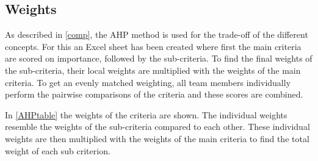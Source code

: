     

    

    
    


\subsection{Weights}
\label{subsec:weights}

As described in \autoref{comp}, the AHP method is used for the trade-off of the different concepts. For this an Excel sheet has been created where first the main criteria are scored on importance, followed by the sub-criteria. To find the final weights of the sub-criteria, their local weights are multiplied with the weights of the main criteria. To get an evenly matched weighting, all team members individually perform the pairwise comparisons of the criteria and these scores are combined. 



In \autoref{AHPtable} the weights of the criteria are shown. The individual weights resemble the weights of the sub-criteria compared to each other. These individual weights are then multiplied with the weights of the main criteria to find the total weight of each sub criterion.


